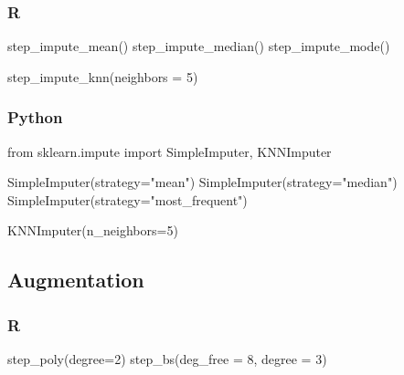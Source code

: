 \documentclass[
  letterpaper,
  DIV=11,
  numbers=noendperiod]{scrreprt}
\newenvironment{Shaded}{\begin{snugshade}}{\end{snugshade}}
\newcommand{\AttributeTok}[1]{\textcolor[rgb]{0.40,0.46,0.14}{#1}}
\newcommand{\DecValTok}[1]{\textcolor[rgb]{0.68,0.00,0.00}{#1}}
\newcommand{\FunctionTok}[1]{\textcolor[rgb]{0.28,0.35,0.67}{#1}}
\newcommand{\ImportTok}[1]{\textcolor[rgb]{0.00,0.46,0.62}{#1}}
\newcommand{\NormalTok}[1]{\textcolor[rgb]{0.00,0.46,0.62}{#1}}
\newcommand{\OperatorTok}[1]{\textcolor[rgb]{0.37,0.37,0.37}{#1}}
\newcommand{\StringTok}[1]{\textcolor[rgb]{0.13,0.47,0.30}{#1}}
\begin{document}
\hypertarget{r-67}{%
\subsubsection{R}\label{r-67}}

\begin{Shaded}
\begin{Highlighting}[]
\FunctionTok{step\_impute\_mean}\NormalTok{()}
\FunctionTok{step\_impute\_median}\NormalTok{()}
\FunctionTok{step\_impute\_mode}\NormalTok{()}

\FunctionTok{step\_impute\_knn}\NormalTok{(}\AttributeTok{neighbors =} \DecValTok{5}\NormalTok{)}
\end{Highlighting}
\end{Shaded}

\hypertarget{python-67}{%
\subsubsection{Python}\label{python-67}}

\begin{Shaded}
\begin{Highlighting}[]
\ImportTok{from}\NormalTok{ sklearn.impute }\ImportTok{import}\NormalTok{ SimpleImputer, KNNImputer}

\NormalTok{SimpleImputer(strategy}\OperatorTok{=}\StringTok{"mean"}\NormalTok{)}
\NormalTok{SimpleImputer(strategy}\OperatorTok{=}\StringTok{"median"}\NormalTok{)}
\NormalTok{SimpleImputer(strategy}\OperatorTok{=}\StringTok{"most\_frequent"}\NormalTok{)}

\NormalTok{KNNImputer(n\_neighbors}\OperatorTok{=}\DecValTok{5}\NormalTok{)}
\end{Highlighting}
\end{Shaded}

\hypertarget{augmentation}{%
\subsection{Augmentation}\label{augmentation}}

\hypertarget{r-68}{%
\subsubsection{R}\label{r-68}}

\begin{Shaded}
\begin{Highlighting}[]
\FunctionTok{step\_poly}\NormalTok{(}\AttributeTok{degree=}\DecValTok{2}\NormalTok{)}
\FunctionTok{step\_bs}\NormalTok{(}\AttributeTok{deg\_free =} \DecValTok{8}\NormalTok{, }\AttributeTok{degree =} \DecValTok{3}\NormalTok{)}
\end{Highlighting}
\end{Shaded}
\end{document}
